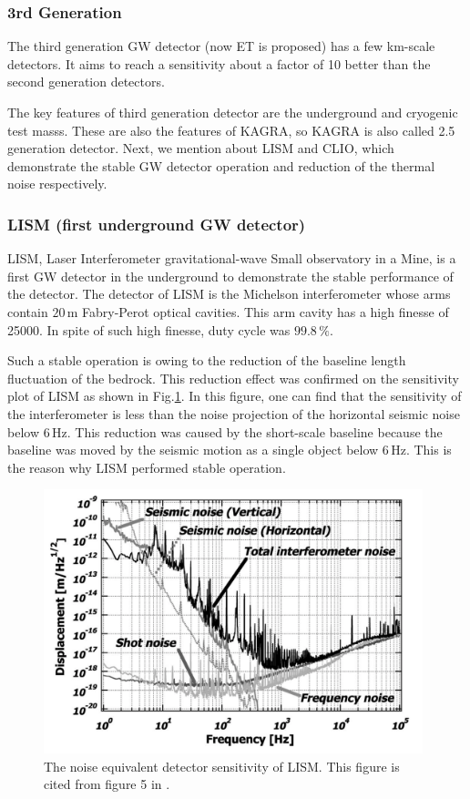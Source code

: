 \subsubsection{3rd Generation}
The third generation GW detector (now ET is proposed) has a few km-scale detectors. It aims to reach a sensitivity about a factor of 10 better than the second generation detectors.

The key features of third generation detector are the underground and cryogenic test masss. These are also the features of KAGRA, so KAGRA is also called 2.5 generation detector. Next, we mention about LISM and CLIO, which demonstrate the stable GW detector operation and reduction of the thermal noise respectively.


\subsubsection{LISM (first underground GW detector)}
LISM, Laser Interferometer gravitational-wave Small observatory in a Mine, is a first GW detector in the underground to demonstrate the stable performance of the detector. The detector of LISM is the Michelson interferometer whose arms contain $20\,\mathrm{m}$ Fabry-Perot optical cavities. This arm cavity has a high finesse of 25000. In spite of such high finesse, duty cycle was $99.8\,\%$.

Such a stable operation is owing to the reduction of the baseline length fluctuation of the bedrock. This reduction effect was confirmed on the sensitivity plot of LISM as shown in Fig.\ref{img:img122}. In this figure, one can find that the sensitivity of the interferometer is less than the noise projection of the horizontal seismic noise below $6\,\mathrm{Hz}$. This reduction was caused by the short-scale baseline because the baseline was moved by the seismic motion as a single object below $6\,\mathrm{Hz}$. This is the reason why LISM performed stable operation. 
\begin{figure}[h]
  \begin{center}   
    \includegraphics[width=11cm]{./img_chap1/img122.png}
    \caption{The noise equivalent detector sensitivity of LISM. This figure is cited from figure 5 in \cite{sato2004ultrastable}. } \label{img:img122}
  \end{center}
\end{figure}


